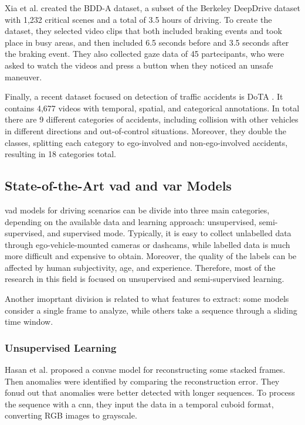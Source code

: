 Xia et al. created the BDD-A \cite{bdd_a} dataset, a subset of the Berkeley 
DeepDrive dataset \cite{bdd100k} with 1,232 critical scenes and a total of 
3.5 hours of driving. To create the dataset, they selected video clips that 
both included braking events and took place in busy areas, and then included 
6.5 seconds before and 3.5 seconds after the braking event.
They also collected gaze data of 45 partecipants, who were asked to watch 
the videos and press a button when they noticed an unsafe maneuver.

Finally, a recent dataset focused on detection of traffic accidents is DoTA 
\cite{dota_dataset}. It contains 4,677 videos with temporal, spatial, and 
categorical annotations. In total there are 9 different categories of accidents,
including collision with other vehicles in different directions and out-of-control 
situations. Moreover, they double the classes, splitting each category to 
ego-involved and non-ego-involved accidents, resulting in 18 categories total.

\subsection{State-of-the-Art \acs{vad} and \acs{var} Models}
\acl{vad} models for driving scenarios can be divide into three main categories, 
depending on the available data and learning approach: 
unsupervised, semi-supervised, and supervised mode.
Typically, it is easy to collect unlabelled data through ego-vehicle-mounted 
cameras or dashcams, while labelled data is much more difficult and expensive 
to obtain. Moreover, the quality of the labels can be affected by human 
subjectivity, age, and experience. Therefore, most of the research in this 
field is focused on unsupervised and semi-supervised learning.

Another imoprtant division is related to what features to extract: some models 
consider a single frame to analyze, while others take a sequence through a 
sliding time window. 

\subsubsection*{Unsupervised Learning}
Hasan et al. \cite{hasan_convae} proposed a \ac{convae} model for reconstructing 
some stacked frames. Then anomalies were identified by comparing the 
reconstruction error. They fonud out that anomalies were better detected with 
longer sequences. To process the sequence with a \ac{cnn}, they input the data 
in a temporal cuboid format, converting RGB images to grayscale.

